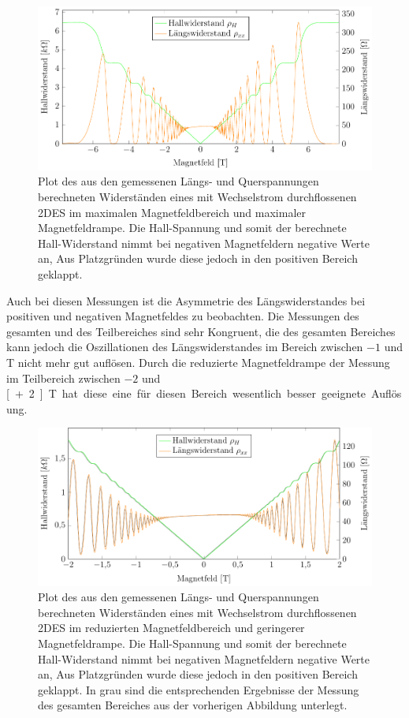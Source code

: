 \begin{figure}[h]
	\centering
	\includegraphics{graphs/ac/full_range.pdf}
	\caption[Wechselstrommessung im maximalen Magnetfeldbereich]{
		Plot des aus den gemessenen Längs- und Querspannungen berechneten Widerständen eines mit Wechselstrom durchflossenen 2DES im maximalen Magnetfeldbereich und maximaler Magnetfeldrampe. Die Hall-Spannung und somit der berechnete Hall-Widerstand nimmt bei negativen Magnetfeldern negative Werte an, Aus Platzgründen wurde diese jedoch in den positiven Bereich geklappt.
	}
	\label{fig:full_range_ac}
\end{figure}

Auch bei diesen Messungen ist die Asymmetrie des Längswiderstandes bei positiven und negativen Magnetfeldes zu beobachten. Die Messungen des gesamten und des Teilbereiches sind sehr Kongruent, die des gesamten Bereiches kann jedoch die Oszillationen des Längswiderstandes im Bereich zwischen $-1$ und \unit[1]{T} nicht mehr gut auflösen. Durch die reduzierte Magnetfeldrampe der Messung im Teilbereich zwischen $-2$ und \unit[+2]{T} hat diese eine für diesen Bereich wesentlich besser geeignete Auflösung.


\begin{figure}[h]
	\centering
	\includegraphics{graphs/ac/pm2T_range.pdf}
	\caption[Höher aufgelöste Gleichstrommessung in Magnetfeldteilbereich]{
		Plot des aus den gemessenen Längs- und Querspannungen berechneten Widerständen eines mit Wechselstrom durchflossenen 2DES im reduzierten Magnetfeldbereich und geringerer Magnetfeldrampe. Die Hall-Spannung und somit der berechnete Hall-Widerstand nimmt bei negativen Magnetfeldern negative Werte an, Aus Platzgründen wurde diese jedoch in den positiven Bereich geklappt. In grau sind die entsprechenden Ergebnisse der Messung des gesamten Bereiches aus der vorherigen Abbildung unterlegt.
	}
	\label{fig:2T_range_ac}
\end{figure}

